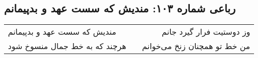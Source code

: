 \begin{center}
\section*{رباعی شماره ۱۰۳: مندیش که سست عهد و بدپیمانم}
\label{sec:103}
\begin{longtable}{l p{0.5cm} r}
مندیش که سست عهد و بدپیمانم
&&
وز دوستیت فرار گیرد جانم
\\
هرچند که به خط جمال منسوخ شود
&&
من خط تو همچنان زنخ می‌خوانم
\\
\end{longtable}
\end{center}
